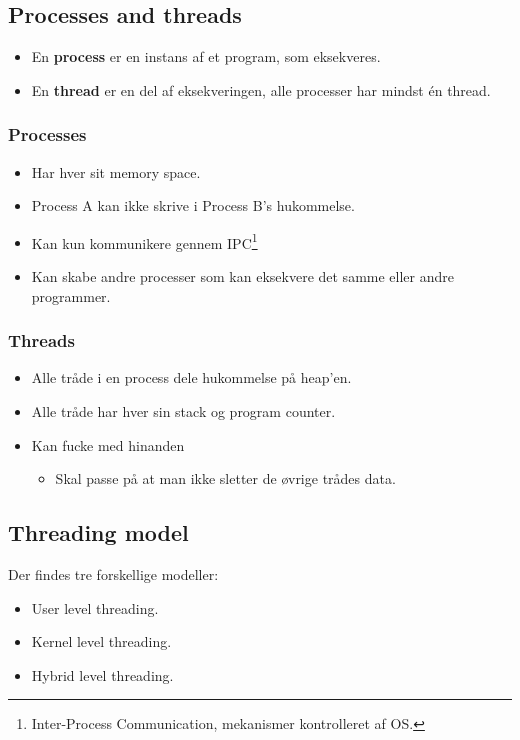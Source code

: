 \subsection{Processes and threads}
\begin{itemize}
	\item En \textbf{process} er en instans af et program, som eksekveres.
	\item En \textbf{thread} er en del af eksekveringen, alle processer har mindst én thread.
\end{itemize}

\subsubsection*{Processes}
\begin{itemize}
	\item Har hver sit memory space.
	\item Process A kan ikke skrive i Process B's hukommelse.
	\item Kan kun kommunikere gennem IPC\footnote{Inter-Process Communication, mekanismer kontrolleret af OS.}
	\item Kan skabe andre processer som kan eksekvere det samme eller andre programmer.
\end{itemize}

\subsubsection*{Threads}
\begin{itemize}
	\item Alle tråde i en process dele hukommelse på heap'en.
	\item Alle tråde har hver sin stack og program counter.
	\item Kan fucke med hinanden
	\begin{itemize}
		\item Skal passe på at man ikke sletter de øvrige trådes data.
	\end{itemize}
\end{itemize}

\subsection{Threading model}
Der findes tre forskellige modeller:

\begin{itemize}
	\item User level threading.
	\item Kernel level threading.
	\item Hybrid level threading.
\end{itemize}


